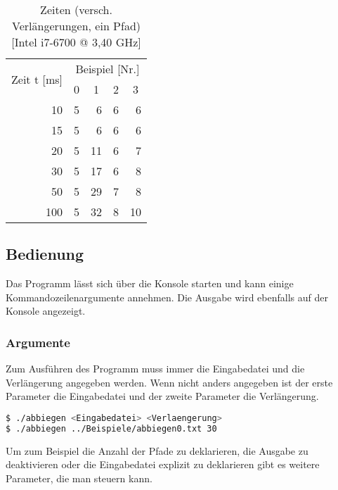 \documentclass[a4paper,10pt,ngerman]{scrartcl}
\begin{document}
\begin{table}[ht]
  \centering
  \begin{tabular}{c|r|r|r|r|r|}
    \multicolumn{2}{c|}{\multirow{2}{*}{Zeit t [ms]}} & \multicolumn{4}{|c|}{Beispiel [Nr.]} \\
    \cline{3-6}
    \multicolumn{2}{c|}{} & \multicolumn{1}{|c|}{0} & \multicolumn{1}{|c|}{1} & \multicolumn{1}{|c|}{2} & \multicolumn{1}{|c|}{3} \\
    \hline
    \parbox[t]{3.5mm}{}
    & 10  & 5 &  6 & 6 &  6 \\
    & 15  & 5 &  6 & 6 &  6 \\
    & 20  & 5 & 11 & 6 &  7 \\
    & 30  & 5 & 17 & 6 &  8 \\
    & 50  & 5 & 29 & 7 &  8 \\
    & 100 & 5 & 32 & 8 & 10 \\
    \hline
  \end{tabular}
  \caption{Zeiten (versch. Verlängerungen, ein Pfad) [Intel i7-6700 @ 3,40 GHz]}
  \label{tab:difmaxlen}
\end{table}

\subsection{Bedienung}
Das Programm lässt sich über die Konsole starten und kann einige Kommandozeilenargumente annehmen. Die Ausgabe wird ebenfalls auf der Konsole angezeigt.

\subsubsection{Argumente}
Zum Ausführen des Programm muss immer die Eingabedatei und die Verlängerung angegeben werden. Wenn nicht anders angegeben ist der erste Parameter die Eingabedatei
und der zweite Parameter die Verlängerung.

\begin{lstlisting}[language=bash, numbers=none, frame=single]
$ ./abbiegen <Eingabedatei> <Verlaengerung>
$ ./abbiegen ../Beispiele/abbiegen0.txt 30
\end{lstlisting}

Um zum Beispiel die Anzahl der Pfade zu deklarieren, die Ausgabe zu deaktivieren oder die Eingabedatei explizit zu deklarieren gibt es weitere Parameter,
die man steuern kann.
\end{document}
